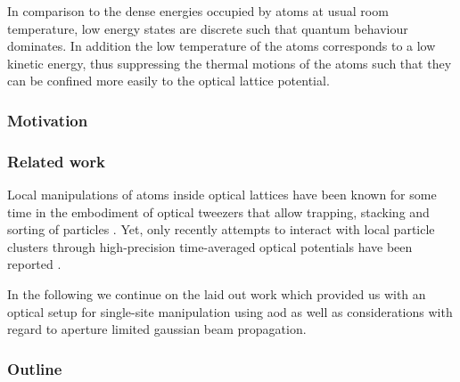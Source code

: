 In comparison to the dense energies occupied by atoms at usual room
temperature, low energy states are discrete such that quantum
behaviour dominates. In addition the low temperature of the atoms corresponds
to a low kinetic energy, thus suppressing the thermal motions of the atoms
such that they can be confined more easily to the optical lattice potential.

\subsubsection{Motivation}

\subsubsection{Related work}

Local manipulations of atoms inside optical lattices have been known for some
time in the embodiment of optical tweezers that allow trapping, stacking and
sorting of particles \cite{Tadmor2004}. Yet, only recently attempts to
interact with local particle clusters through high-precision time-averaged
optical potentials have been reported \cite{Roy2016}.

In the following we continue on the laid out work \cite{Hertlein2017} which
provided us with an optical setup for single-site manipulation using
\gls{aod} as well as considerations with regard to aperture limited
gaussian beam propagation.

\subsubsection{Outline}
